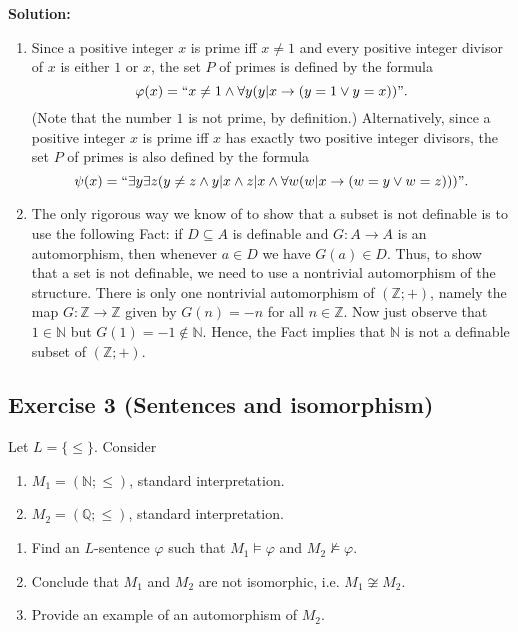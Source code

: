 \documentclass[10pt]{article}
\begin{document}
\textbf{Solution:}
\begin{enumerate}[label=(\arabic*)]
    \item Since a positive integer $x$ is prime iff $x \neq 1$ and every positive integer divisor of $x$ is either $1$ or $x$, the set $P$ of primes is defined by the formula
    \[
    \varphi(x) = ``x \neq 1 \land \forall y(y|x \rightarrow (y = 1 \lor y = x))".
    \]
    (Note that the number $1$ is not prime, by definition.) Alternatively, since a positive integer $x$ is prime iff $x$ has exactly two positive integer divisors, the set $P$ of primes is also defined by the formula
    \[
    \psi(x) = ``\exists y \exists z(y \neq z \land y|x \land z|x \land \forall w(w|x \rightarrow (w = y \lor w = z)))".
    \]
    \item The only rigorous way we know of to show that a subset is not definable is to use the following Fact: if $D \subseteq A$ is definable and $G : A \rightarrow A$ is an automorphism, then whenever $a \in D$ we have $G(a) \in D$. Thus, to show that a set is not definable, we need to use a nontrivial automorphism of the structure. There is only one nontrivial automorphism of $(\mathbb{Z}; +)$, namely the map $G : \mathbb{Z} \rightarrow \mathbb{Z}$ given by $G(n) = -n$ for all $n \in \mathbb{Z}$. Now just observe that $1 \in \mathbb{N}$ but $G(1) = -1 \notin \mathbb{N}$. Hence, the Fact implies that $\mathbb{N}$ is not a definable subset of $(\mathbb{Z}; +)$.
\end{enumerate}

\subsection*{Exercise 3 (Sentences and isomorphism)}
Let $L = \{\leq\}$. Consider

\begin{enumerate}[label=(\alph*)]
    \item $M_1 = (\mathbb{N}; \leq)$, standard interpretation.
    \item $M_2 = (\mathbb{Q}; \leq)$, standard interpretation.
\end{enumerate}

\begin{enumerate}[label=(\arabic*)]
    \item Find an $L$-sentence $\varphi$ such that $M_1 \models \varphi$ and $M_2 \not\models \varphi$.
    \item Conclude that $M_1$ and $M_2$ are not isomorphic, i.e. $M_1 \not\cong M_2$.
    \item Provide an example of an automorphism of $M_2$.
\end{enumerate}
\end{document}
